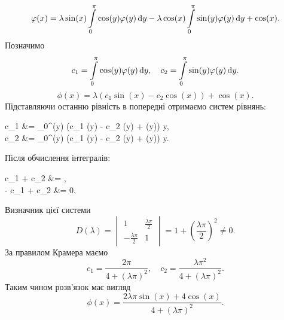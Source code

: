 \begin{solution*}
	\[ \varphi(x) = \lambda \sin(x) \displaystyle\int\limits_0^\pi \cos(y) \varphi(y) \mathop{}\!\mathrm{d} y - \lambda \cos(x) \displaystyle\int\limits_0^\pi \sin(y) \varphi(y) \mathop{}\!\mathrm{d} y + \cos(x). \]
	Позначимо \[ c_1 = \displaystyle\int\limits_0^\pi \cos(y) \varphi(y) \mathop{}\!\mathrm{d} y, \quad c_2 = \displaystyle\int\limits_0^\pi \sin(y) \varphi(y) \mathop{}\!\mathrm{d} y. \]
	\[ \phi(x) = \lambda (c_1 \sin(x) - c_2 \cos(x)) + \cos(x). \]
	Підставляючи останню рівність в попередні отримаємо систем рівнянь:
	\begin{system*}
		c_1 &= \Int_0^\pi \cos(y) (\lambda c_1 \sin(y) - \lambda c_2 \cos(y) + \cos(y)) \diff y, \\
		c_2 &= \Int_0^\pi \sin(y) (\lambda c_1 \sin(y) - \lambda c_2 \cos(y) + \cos(y)) \diff y.
	\end{system*}
	Після обчислення інтегралів:
	\begin{system*}
		c_1 +  c_2 &= \frac{\pi}{2}, \\
		-  c_1 + c_2 &= 0.
	\end{system*}
	Визначник цієї системи
	\[ D(\lambda) = \begin{vmatrix} 1 & \frac{\lambda\pi}{2} \\ -\frac{\lambda\pi}{2} & 1 \end{vmatrix} = 1 + \left( \frac{\lambda \pi}{2} \right)^2 \ne 0. \]
	За правилом Крамера маємо
	\[ c_1 = \dfrac{2 \pi}{4 + (\lambda \pi)^2}, \quad c_2 = \dfrac{\lambda \pi^2}{4 + (\lambda \pi)^2}. \]
	Таким чином розв’язок має вигляд
	\[ \phi(x) = \dfrac{2 \lambda \pi \sin(x) + 4 \cos (x)}{4 + (\lambda \pi)^2}. \]
\end{solution*}